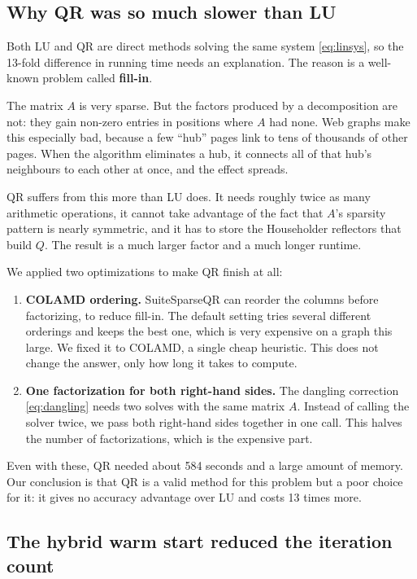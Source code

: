 \documentclass[11pt,a4paper]{article}
\begin{document}
\subsection{Why QR was so much slower than LU}
\label{sec:qr}

Both LU and QR are direct methods solving the same system \eqref{eq:linsys}, so the
13-fold difference in running time needs an explanation. The reason is a well-known
problem called \textbf{fill-in}.

The matrix $A$ is very sparse. But the factors produced by a decomposition are not:
they gain non-zero entries in positions where $A$ had none. Web graphs make this
especially bad, because a few ``hub'' pages link to tens of thousands of other pages.
When the algorithm eliminates a hub, it connects all of that hub's neighbours to each
other at once, and the effect spreads.

QR suffers from this more than LU does. It needs roughly twice as many arithmetic
operations, it cannot take advantage of the fact that $A$'s sparsity pattern is nearly
symmetric, and it has to store the Householder reflectors that build $Q$. The result
is a much larger factor and a much longer runtime.

We applied two optimizations to make QR finish at all:

\begin{enumerate}
  \item \textbf{COLAMD ordering.} SuiteSparseQR can reorder the columns before
        factorizing, to reduce fill-in. The default setting tries several different
        orderings and keeps the best one, which is very expensive on a graph this
        large. We fixed it to COLAMD, a single cheap heuristic. This does not change
        the answer, only how long it takes to compute.
  \item \textbf{One factorization for both right-hand sides.} The dangling correction
        \eqref{eq:dangling} needs two solves with the same matrix $A$. Instead of
        calling the solver twice, we pass both right-hand sides together in one call.
        This halves the number of factorizations, which is the expensive part.
\end{enumerate}

Even with these, QR needed about 584 seconds and a large amount of memory. Our
conclusion is that QR is a valid method for this problem but a poor choice for it: it
gives no accuracy advantage over LU and costs 13 times more.

\subsection{The hybrid warm start reduced the iteration count}
\label{sec:hybrid}
\end{document}
